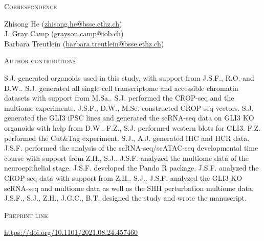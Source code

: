 \vspace{1cm}

\noindent
{\large\textsc{Correspondence}} 

\noindent
Zhisong He (\href{mailto:zhisong.he@bsse.ethz.ch}{zhisong.he@bsse.ethz.ch})\\
J. Gray Camp (\href{mailto:grayson.camp@iob.ch}{grayson.camp@iob.ch})\\
Barbara Treutlein (\href{mailto:barbara.treutlein@bsse.ethz.ch}{barbara.treutlein@bsse.ethz.ch})

\vspace{1cm}

\noindent
\clearpage
{\large\textsc{Author contributions}} 

\noindent
S.J. generated organoids used in this study, with support from J.S.F., R.O. and D.W.. S.J. generated all single-cell transcriptome and accessible chromatin datasets with support from M.Sa.. S.J. performed the CROP-seq and the multiome experiments. J.S.F., D.W., M.Se. constructed CROP-seq vectors. S.J. generated the GLI3 iPSC lines and generated the scRNA-seq data on GLI3 KO organoids with help from D.W.. F.Z., S.J. performed western blots for GLI3. F.Z. performed the Cut\&Tag experiment. S.J., A.J. generated IHC and HCR data. J.S.F. performed the analysis of the scRNA-seq/scATAC-seq developmental time course with support from Z.H., S.J.. J.S.F. analyzed the multiome data of the neuroepithelial stage. J.S.F. developed the Pando R package. J.S.F. analyzed the CROP-seq data with support from Z.H.. S.J.. J.S.F. analyzed the GLI3 KO scRNA-seq and multiome data as well as the SHH perturbation multiome data. J.S.F., S.J., Z.H., J.G.C., B.T. designed the study and wrote the manuscript.

\vspace{1cm}

\noindent
{\large\textsc{Preprint link}} 

\noindent
\href{https://doi.org/10.1101/2021.08.24.457460}{https://doi.org/10.1101/2021.08.24.457460}



